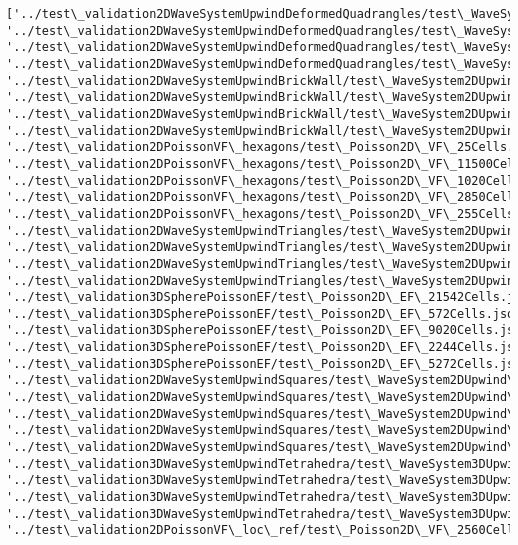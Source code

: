 \documentclass[11pt]{article}
\begin{document}
\begin{Verbatim}[commandchars=\\\{\}]
['../test\_validation2DWaveSystemUpwindDeformedQuadrangles/test\_WaveSystem2DUpwind\_SquareWithDeformedQuadrangles16Cells.json', '../test\_validation2DWaveSystemUpwindDeformedQuadrangles/test\_WaveSystem2DUpwind\_SquareWithDeformedQuadrangles256Cells.json', '../test\_validation2DWaveSystemUpwindDeformedQuadrangles/test\_WaveSystem2DUpwind\_SquareWithDeformedQuadrangles64Cells.json', '../test\_validation2DWaveSystemUpwindDeformedQuadrangles/test\_WaveSystem2DUpwind\_SquareWithDeformedQuadrangles1024Cells.json', '../test\_validation2DWaveSystemUpwindBrickWall/test\_WaveSystem2DUpwind\_squareWithBrickWall2500Cells.json', '../test\_validation2DWaveSystemUpwindBrickWall/test\_WaveSystem2DUpwind\_squareWithBrickWall900Cells.json', '../test\_validation2DWaveSystemUpwindBrickWall/test\_WaveSystem2DUpwind\_squareWithBrickWall225Cells.json', '../test\_validation2DWaveSystemUpwindBrickWall/test\_WaveSystem2DUpwind\_squareWithBrickWall25Cells.json', '../test\_validation2DPoissonVF\_hexagons/test\_Poisson2D\_VF\_25Cells.json', '../test\_validation2DPoissonVF\_hexagons/test\_Poisson2D\_VF\_11500Cells.json', '../test\_validation2DPoissonVF\_hexagons/test\_Poisson2D\_VF\_1020Cells.json', '../test\_validation2DPoissonVF\_hexagons/test\_Poisson2D\_VF\_2850Cells.json', '../test\_validation2DPoissonVF\_hexagons/test\_Poisson2D\_VF\_255Cells.json', '../test\_validation2DWaveSystemUpwindTriangles/test\_WaveSystem2DUpwind\_squareWithTriangles6422Cells.json', '../test\_validation2DWaveSystemUpwindTriangles/test\_WaveSystem2DUpwind\_squareWithTriangles934Cells.json', '../test\_validation2DWaveSystemUpwindTriangles/test\_WaveSystem2DUpwind\_squareWithTriangles40Cells.json', '../test\_validation2DWaveSystemUpwindTriangles/test\_WaveSystem2DUpwind\_squareWithTriangles224Cells.json', '../test\_validation3DSpherePoissonEF/test\_Poisson2D\_EF\_21542Cells.json', '../test\_validation3DSpherePoissonEF/test\_Poisson2D\_EF\_572Cells.json', '../test\_validation3DSpherePoissonEF/test\_Poisson2D\_EF\_9020Cells.json', '../test\_validation3DSpherePoissonEF/test\_Poisson2D\_EF\_2244Cells.json', '../test\_validation3DSpherePoissonEF/test\_Poisson2D\_EF\_5272Cells.json', '../test\_validation2DWaveSystemUpwindSquares/test\_WaveSystem2DUpwind\_meshSquareWithSquares16Cells.json', '../test\_validation2DWaveSystemUpwindSquares/test\_WaveSystem2DUpwind\_meshSquareWithSquares4096Cells.json', '../test\_validation2DWaveSystemUpwindSquares/test\_WaveSystem2DUpwind\_meshSquareWithSquares64Cells.json', '../test\_validation2DWaveSystemUpwindSquares/test\_WaveSystem2DUpwind\_meshSquareWithSquares1024Cells.json', '../test\_validation2DWaveSystemUpwindSquares/test\_WaveSystem2DUpwind\_meshSquareWithSquares256Cells.json', '../test\_validation3DWaveSystemUpwindTetrahedra/test\_WaveSystem3DUpwind\_CubeWithTetrahedra55566Cells.json', '../test\_validation3DWaveSystemUpwindTetrahedra/test\_WaveSystem3DUpwind\_CubeWithTetrahedra7986Cells.json', '../test\_validation3DWaveSystemUpwindTetrahedra/test\_WaveSystem3DUpwind\_CubeWithTetrahedra750Cells.json', '../test\_validation3DWaveSystemUpwindTetrahedra/test\_WaveSystem3DUpwind\_CubeWithTetrahedra105456Cells.json', '../test\_validation2DPoissonVF\_loc\_ref/test\_Poisson2D\_VF\_2560Cells.json', 
\end{Verbatim}
\end{document}
